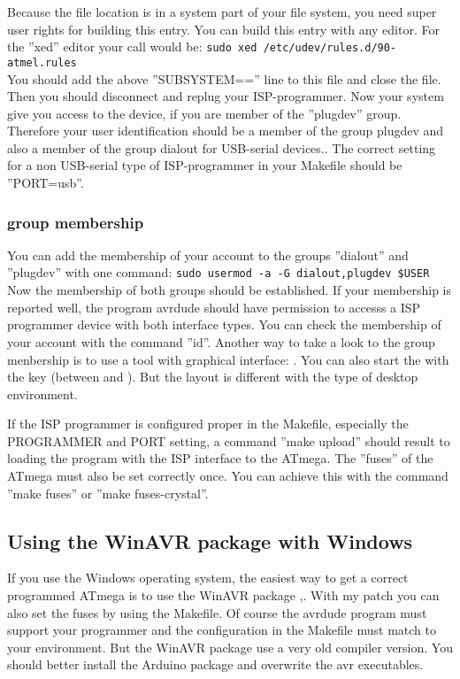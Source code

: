 Because the file location is in a system part of your file system, you need super user rights
for building this entry. You can build this entry with any editor.
For the ''xed'' editor your call would be:
\verb"sudo xed /etc/udev/rules.d/90-atmel.rules"\\
You should add the above ''SUBSYSTEM=='' line to this file and close the file.
Then you should disconnect and replug your ISP-programmer.
Now your system give you access to the device, if you are member of the ''plugdev'' group.
Therefore your user identification should be a member of the group plugdev and also
a member of the group dialout for USB-serial devices..
The correct setting for a non USB-serial type of ISP-programmer
in your Makefile should be ''PORT=usb''.\\

\subsubsection{group membership}
 
You can add the membership of your account to the groups ''dialout'' and ''plugdev'' with one command:
\verb"sudo usermod -a -G dialout,plugdev $USER"\\
Now the membership of both groups should be established.
If your membership is reported well, the program avrdude should have permission to accesss
a ISP programmer device with both interface types.
You can check the membership of your account with the command ''id''.
Another way to take a look to the group menbership is to use a tool with
graphical  interface:
.
You can also start the  with the \keys{\winmenu} key (between  and
\keys{\Alt}).
But the layout is different with the type of desktop environment.

If the ISP programmer is configured proper in the Makefile, especially the PROGRAMMER
and PORT setting, a command ''make upload''
should result to loading the program with the ISP interface to the ATmega.
The ''fuses'' of the ATmega must also be set correctly once.
You can achieve this with the command ''make fuses'' or ''make fuses-crystal''.

\subsection{Using the WinAVR package with Windows}
If you use the Windows operating system, the easiest way to get a correct programmed
ATmega is to use the WinAVR package \cite{winavr1},\cite{winavr2}.
With my patch \cite{winavr3} you can also set the fuses by using the Makefile.
Of course the avrdude program must support your programmer and the configuration
in the Makefile must match to your environment.
But the WinAVR package use a very old compiler version. You should better install
the Arduino package and overwrite the avr executables.

